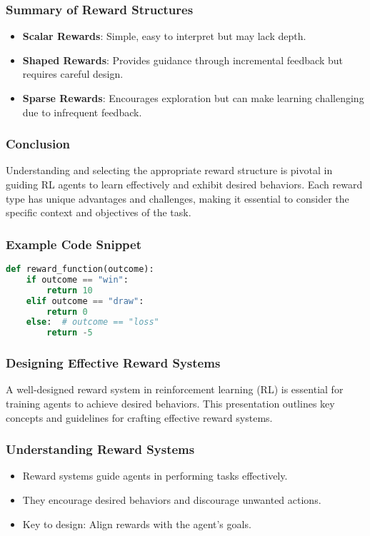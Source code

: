 \documentclass[aspectratio=169]{beamer}
\begin{document}
\begin{frame}[fragile]
    \frametitle{Summary of Reward Structures}
    \begin{itemize}
        \item \textbf{Scalar Rewards}: Simple, easy to interpret but may lack depth.
        \item \textbf{Shaped Rewards}: Provides guidance through incremental feedback but requires careful design.
        \item \textbf{Sparse Rewards}: Encourages exploration but can make learning challenging due to infrequent feedback.
    \end{itemize}
\end{frame}

\begin{frame}[fragile]
    \frametitle{Conclusion}
    Understanding and selecting the appropriate reward structure is pivotal in guiding RL agents to learn effectively and exhibit desired behaviors. Each reward type has unique advantages and challenges, making it essential to consider the specific context and objectives of the task.
\end{frame}

\begin{frame}[fragile]
    \frametitle{Example Code Snippet}
    \begin{lstlisting}[language=Python]
def reward_function(outcome):
    if outcome == "win":
        return 10
    elif outcome == "draw":
        return 0
    else:  # outcome == "loss"
        return -5
    \end{lstlisting}
\end{frame}

\begin{frame}[fragile]
    \frametitle{Designing Effective Reward Systems}
    A well-designed reward system in reinforcement learning (RL) is essential for training agents to achieve desired behaviors. This presentation outlines key concepts and guidelines for crafting effective reward systems.
\end{frame}

\begin{frame}[fragile]
    \frametitle{Understanding Reward Systems}
    \begin{itemize}
        \item Reward systems guide agents in performing tasks effectively.
        \item They encourage desired behaviors and discourage unwanted actions.
        \item Key to design: Align rewards with the agent’s goals.
    \end{itemize}
\end{frame}
\end{document}
